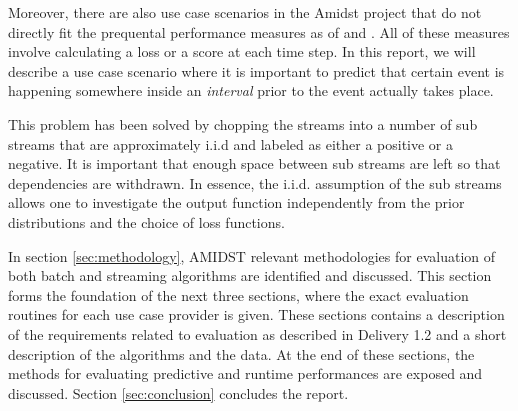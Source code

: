 Moreover, there are also use case scenarios in the Amidst project that do not directly fit the prequental performance measures as of \cite{Gam13} and \cite{Brz14}.  All of these measures involve calculating a loss or a score at each time step.
In this report, we will describe a use case scenario where it is important to predict that certain event is happening somewhere inside an \emph{interval} prior to the event actually takes place.  

This problem has been solved by chopping the streams into a number of sub streams that are approximately i.i.d and labeled as either a positive or a negative.  It is important that enough space between sub streams are left so that dependencies are withdrawn.  In essence, the i.i.d. assumption of the sub streams allows one to investigate the output function independently from the prior distributions and the choice of loss functions.  


%


%
%
%

In section \ref{sec:methodology}, AMIDST relevant methodologies for evaluation of both batch and streaming algorithms are identified and discussed.  This section forms the foundation of the next three sections, where the exact evaluation routines for each use case provider is given. These sections contains a description of the requirements related to evaluation as described in Delivery 1.2 and a short description of the algorithms and the data.  At the end of these sections, the methods for evaluating predictive and runtime performances are exposed and discussed.  Section \ref{sec:conclusion} concludes the report.

